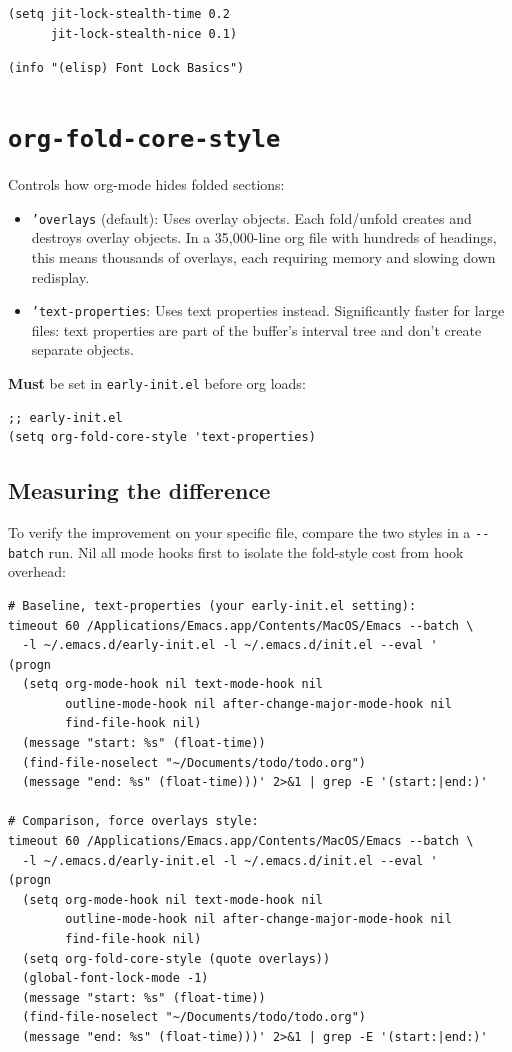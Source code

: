 \begin{verbatim}
(setq jit-lock-stealth-time 0.2
      jit-lock-stealth-nice 0.1)
\end{verbatim}

\texttt{(info "(elisp) Font Lock Basics")}

\section{\texttt{org-fold-core-style}}\label{org-fold-core-style}

Controls how org-mode hides folded sections:

\begin{itemize}
\item \texttt{'overlays} (default): Uses overlay objects. Each fold/unfold creates and destroys overlay objects. In a 35,000-line org file with hundreds of headings, this means thousands of overlays, each requiring memory and slowing down redisplay.
\item \texttt{'text-properties}: Uses text properties instead. Significantly faster for large files: text properties are part of the buffer's interval tree and don't create separate objects.
\end{itemize}

\textbf{Must} be set in \texttt{early-init.el} before org loads:

\begin{verbatim}
;; early-init.el
(setq org-fold-core-style 'text-properties)
\end{verbatim}

\subsection{Measuring the difference}\label{measuring-the-difference}

To verify the improvement on your specific file, compare the two styles in a \texttt{-\/-batch} run. Nil all mode hooks first to isolate the fold-style cost from hook overhead:

\begin{verbatim}
# Baseline, text-properties (your early-init.el setting):
timeout 60 /Applications/Emacs.app/Contents/MacOS/Emacs --batch \
  -l ~/.emacs.d/early-init.el -l ~/.emacs.d/init.el --eval '
(progn
  (setq org-mode-hook nil text-mode-hook nil
        outline-mode-hook nil after-change-major-mode-hook nil
        find-file-hook nil)
  (message "start: %s" (float-time))
  (find-file-noselect "~/Documents/todo/todo.org")
  (message "end: %s" (float-time)))' 2>&1 | grep -E '(start:|end:)'

# Comparison, force overlays style:
timeout 60 /Applications/Emacs.app/Contents/MacOS/Emacs --batch \
  -l ~/.emacs.d/early-init.el -l ~/.emacs.d/init.el --eval '
(progn
  (setq org-mode-hook nil text-mode-hook nil
        outline-mode-hook nil after-change-major-mode-hook nil
        find-file-hook nil)
  (setq org-fold-core-style (quote overlays))
  (global-font-lock-mode -1)
  (message "start: %s" (float-time))
  (find-file-noselect "~/Documents/todo/todo.org")
  (message "end: %s" (float-time)))' 2>&1 | grep -E '(start:|end:)'
\end{verbatim}

